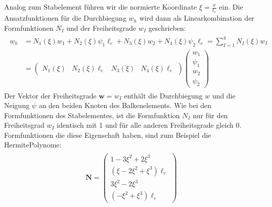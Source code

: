 \documentclass[letterpaper,10pt,german]{jupyterBook}
\begin{document}
\sphinxAtStartPar
Analog zum Stabelement führen wir die normierte Koordinate \(\xi=\frac{x}{\ell_e}\) ein. Die Ansatzfunktionen für die Durchbiegung \(w_h\) wird dann als Linearkombination der Formfunktionen \(N_I\) und der Freiheitsgrade \(w_I\) geschrieben:
\begin{equation}\label{equation:chapters/chapter2/BalkenFEM:Ansatz_Balken}
\begin{split}\begin{align}
  w_h & = N_1(\xi) w_1 + N_2(\xi) \psi_1 \ell_e +  N_3(\xi) w_2 + N_4(\xi) \psi_2 \ell_e = \sum_{I=1}^{4} N_I(\xi) w_I \\
  & = \begin{pmatrix} N_1(\xi) & N_2(\xi)\ell_e & N_3(\xi) & N_4(\xi)\ell_e \end{pmatrix} \begin{pmatrix} w_1 \\ \psi_1 \\ w_2 \\ \psi_2 \end{pmatrix}
\end{align}\end{split}
\end{equation}
\sphinxAtStartPar
Der Vektor der Freiheitsgrade \(\bm{w}=w_I\) enthält die Durchbiegung \(w\) und die Neigung \(\psi\) an den beiden Knoten des Balkenelements. Wie bei den Formfunktionen des Stabelementes, ist die Formfunktion \(N_I\) nur für den Freiheitsgrad \(w_I\) identisch mit 1 und für alle anderen Freiheitsgrade gleich 0. Formfunktionen die diese Eigenschaft haben, sind zum Beispiel die Hermite\sphinxhyphen{}Polynome:
\begin{equation}\label{equation:chapters/chapter2/BalkenFEM:Formfunktion_Balken}
\begin{split}\begin{align}
  \bm{N} = \begin{pmatrix} 
  1-3\xi^2+2\xi^3 \\ 
  (\xi-2\xi^2+\xi^3)\ell_e \\ 
  3\xi^2-2\xi^3 \\ 
  (-\xi^2+\xi^3)\ell_e \end{pmatrix}
\end{align}\end{split}
\end{equation}
\end{document}
